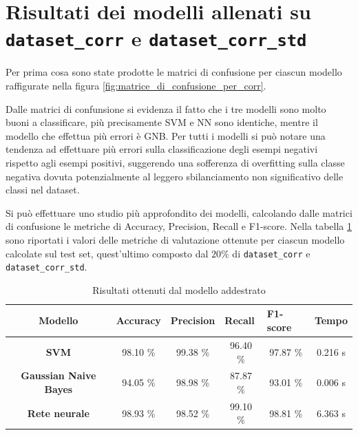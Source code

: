 \section{Risultati dei modelli allenati su \texttt{dataset\_corr} e 
\texttt{dataset\_corr\_std}} \label{sec:risultati_corr} Per prima cosa sono state 
prodotte le matrici di confusione per ciascun modello raffigurate nella figura 
\ref{fig:matrice_di_confusione_per_corr}.

Dalle matrici di confunsione si evidenza il fatto che i tre modelli sono molto
buoni a classificare, più precisamente SVM e NN sono identiche, mentre il modello 
che effettua più errori è GNB. Per tutti i modelli si può notare una tendenza ad
effettuare più errori sulla classificazione degli esempi negativi rispetto agli
esempi positivi, suggerendo una sofferenza di overfitting sulla classe negativa
dovuta potenzialmente al leggero sbilanciamento non significativo delle classi nel dataset.    

Si può effettuare uno studio più approfondito dei modelli, calcolando dalle 
matrici di confusione le metriche di Accuracy, Precision, Recall e F1-score. 
Nella tabella \ref{tab:risultati} sono riportati i valori delle
metriche di valutazione ottenute per ciascun modello calcolate sul test set, quest'ultimo
composto dal $20\%$ di \texttt{dataset\_corr} e \texttt{dataset\_corr\_std}.
\begin{table}[!ht]
    \centering
    \begin{tabular}{@{}clllll@{}}
        \toprule
        \rowcolor[HTML]{EFEFEF}
        \textbf{Modello}                                      & \textbf{Accuracy}            & \textbf{Precision}           & \textbf{Recall}              & \textbf{F1-score}            & \textbf{Tempo}\\ \midrule
        \cellcolor[HTML]{EFEFEF}\textbf{SVM}                  & \multicolumn{1}{c}{98.10 \%}     & \multicolumn{1}{c}{99.38 \%}     & \multicolumn{1}{c}{96.40 \%}     & \multicolumn{1}{c}{97.87 \%}     & \multicolumn{1}{c}{0.216 s} \\
        \cellcolor[HTML]{EFEFEF}\textbf{Gaussian Naive Bayes} & \multicolumn{1}{c}{94.05 \%}    & \multicolumn{1}{c}{98.98 \%}    & \multicolumn{1}{c}{87.87 \%}    & \multicolumn{1}{c}{93.01 \%}    &  \multicolumn{1}{c}{0.006 s} \\
        \cellcolor[HTML]{EFEFEF}\textbf{Rete neurale}         & \multicolumn{1}{c}{98.93 \%} & \multicolumn{1}{c}{98.52 \%} & \multicolumn{1}{c}{99.10 \%} & \multicolumn{1}{c}{98.81 \%} & \multicolumn{1}{c}{6.363 s} \\ \bottomrule
    \end{tabular}
    \caption{Risultati ottenuti dal modello addestrato} 
    \label{tab:risultati}
\end{table}

